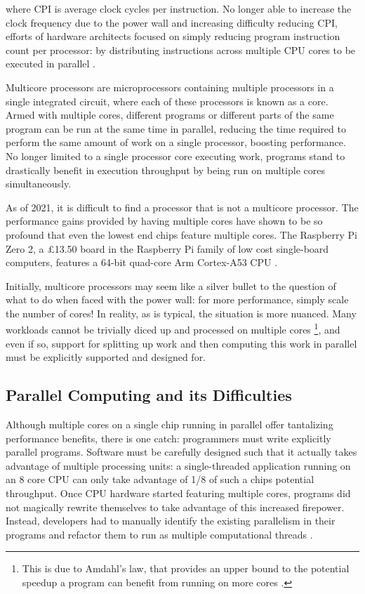 \documentclass[bsc,frontabs,singlespacing,parskip,deptreport,normalheadings]{infthesis}
\begin{document}
where CPI is average clock cycles per instruction. No longer able to increase
the clock frequency due to the power wall and increasing difficulty reducing
CPI, efforts of hardware architects focused on simply reducing program
instruction count per processor: by distributing instructions across multiple
CPU cores to be executed in parallel \cite{etiemble_45-year_2018}.

Multicore processors are microprocessors containing multiple processors in a
single integrated circuit, where each of these processors is known as a core.
Armed with multiple cores, different programs or different parts of the same
program can be run at the same time in parallel, reducing the time required to
perform the same amount of work on a single processor, boosting performance. No
longer limited to a single processor core executing work, programs stand to
drastically benefit in execution throughput by being run on multiple cores
simultaneously.

As of 2021, it is difficult to find a processor that is not a multicore
processor. The performance gains provided by having multiple cores have shown to
be so profound that even the lowest end chips feature multiple cores. The
Raspberry Pi Zero 2, a \pounds13.50 board in the Raspberry Pi family of low cost
single-board computers, features a 64-bit quad-core Arm Cortex-A53 CPU
\cite{ltd_raspberry_nodate}.

Initially, multicore processors may seem like a silver bullet to the question of
what to do when faced with the power wall: for more performance, simply scale
the number of cores! In reality, as is typical, the situation is more nuanced.
Many workloads cannot be trivially diced up and processed on multiple cores
\footnote{This is due to Amdahl's law, that provides an upper bound to the
potential speedup a program can benefit from running on more cores
\cite{bryant_computer_2016}.}, and even if so, support for splitting up work and
then computing this work in parallel must be explicitly supported and designed
for.

\subsection{Parallel Computing and its Difficulties}
\label{section:parallel_computing}

Although multiple cores on a single chip running in parallel offer tantalizing
performance benefits, there is one catch: programmers must write explicitly
parallel programs. Software must be carefully designed such that it actually
takes advantage of multiple processing units: a single-threaded application
running on an 8 core CPU can only take advantage of 1/8 of such a chips
potential throughput. Once CPU hardware started featuring multiple cores,
programs did not magically rewrite themselves to take advantage of this
increased firepower. Instead, developers had to manually identify the existing
parallelism in their programs and refactor them to run as multiple computational
threads \cite{patterson_trouble_2010}.
\end{document}
